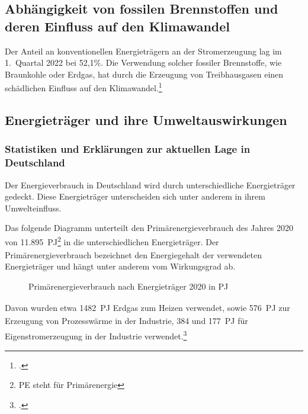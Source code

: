 \documentclass[12pt, ngerman]{article}
\newcommand{\pe}{_{\mathrm{PE}}}
\begin{document}
\subsection{Abhängigkeit von fossilen Brennstoffen und deren Einfluss auf den Klimawandel}

Der Anteil an konventionellen Energieträgern an der Stromerzeugung lag im 1.\ Quartal 2022 bei 52,1\%.
Die Verwendung solcher fossiler Brennstoffe, wie Braunkohle oder Erdgas, hat durch die Erzeugung von
Treibhausgasen einen schädlichen Einfluss auf den Klimawandel.\footcite{wilkeErneuerbareUndKonventionelle2013}

\subsection{Energieträger und ihre Umweltauswirkungen}

\subsubsection{Statistiken und Erklärungen zur aktuellen Lage in Deutschland}\label{subsec:primar}

Der Energieverbrauch in Deutschland wird durch unterschiedliche Energieträger gedeckt.
Diese Energieträger unterscheiden sich unter anderem in ihrem Umwelteinfluss.

Das folgende Diagramm unterteilt den Primärenergieverbrauch des Jahres 2020 von
\qty{11.895}{PJ\pe}\footnote{PE steht für Primärenergie}
in die unterschiedlichen Energieträger.
Der Primärenergieverbrauch bezeichnet den Energiegehalt der verwendeten Energieträger und
hängt unter anderem vom Wirkungsgrad ab.

\begin{figure}[!h]
    \caption{Primärenergieverbrauch nach Energieträger 2020 in
        \unit{PJ\pe}}
\end{figure}

Davon wurden etwa \qty{1482}{PJ\pe} Erdgas zum Heizen verwendet, sowie \qty{576}{PJ\pe}
zur Erzeugung von Prozesswärme in der Industrie, \qty{384}{} und \qty{177}{PJ\pe} für Eigenstromerzeugung
in der Industrie verwendet.\footcite{Industrie, Energieflussbild2020PJLang, WieKannTransformation}
\end{document}
